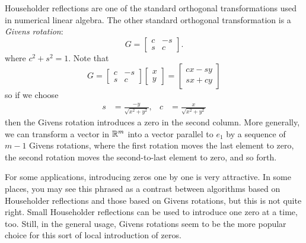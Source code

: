 \documentclass[12pt, leqno]{article}
\begin{document}
Householder reflections are one of the standard orthogonal
transformations used in numerical linear algebra.  The other standard
orthogonal transformation is a {\em Givens rotation}:
\[
  G = \begin{bmatrix}
    c & -s \\
    s & c
  \end{bmatrix}.
\]
where $c^2 + s^2 = 1$.  Note that
\[
  G = \begin{bmatrix}
    c & -s \\
    s & c
  \end{bmatrix}
  \begin{bmatrix}
    x \\ y
  \end{bmatrix} =
  \begin{bmatrix}
    cx - sy \\
    sx + cy
  \end{bmatrix}
\]
so if we choose
\begin{align*}
  s &= \frac{-y}{\sqrt{x^2 + y^2}}, &
  c &= \frac{x}{\sqrt{x^2+y^2}}
\end{align*}
then the Givens rotation introduces a zero in the second column.
More generally, we can transform a vector in $\mathbb{R}^m$ into a vector
parallel to $e_1$ by a sequence of $m-1$ Givens rotations, where
the first rotation moves the last element to zero, the second rotation
moves the second-to-last element to zero, and so forth.

For some applications, introducing zeros one by one is very
attractive.  In some places, you may see this phrased as a contrast
between algorithms based on Householder reflections and those based on
Givens rotations, but this is not quite right.  Small Householder
reflections can be used to introduce one zero at a time, too.
Still, in the general usage, Givens rotations seem to be the more
popular choice for this sort of local introduction of zeros.
\end{document}
